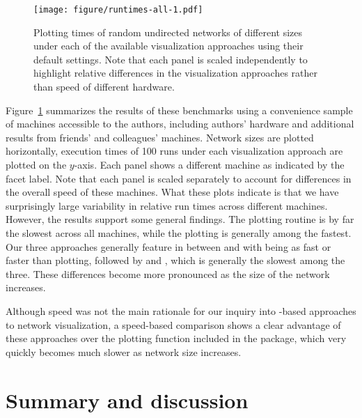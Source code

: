 \begin{figure}[hbtp]
\centering



\texttt{[image: figure/runtimes-all-1.pdf]}
\caption{\label{fig.cap:runtimes-random} Plotting times of random undirected networks of different sizes under each of the available visualization approaches using their default settings. Note that each panel is scaled independently to highlight relative differences in the visualization approaches rather than speed of different hardware.
}
\end{figure}

Figure~\ref{fig.cap:runtimes-random} summarizes the results of these benchmarks using a convenience sample of machines accessible to the authors, including authors' hardware and additional results from friends' and colleagues' machines.
Network sizes are plotted horizontally, execution times of 100 runs under each visualization approach are plotted on the $y$-axis. Each panel shows a different machine as indicated by the facet label. Note that each panel is scaled separately to account for differences in the overall speed of these machines.
What these plots indicate is that we have surprisingly large variability in relative run times across different machines.
However, the results support some  general findings.
The  plotting routine is by far the slowest across all machines, while the  plotting is generally among the fastest. Our three approaches generally feature in between  and  with  being as fast or faster than  plotting, followed by  and , which is generally the slowest among the three. These differences become more pronounced as the size of the network increases.

Although speed was not the main rationale for our inquiry into -based approaches to network visualization, a speed-based comparison shows a clear advantage of these approaches over the plotting function included in the  package, which very quickly becomes much slower as network size increases.

\section{Summary and discussion}

